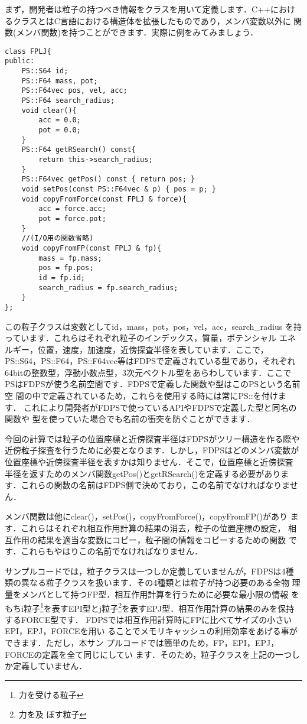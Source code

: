 \documentclass[twocolumn,10pt]{jarticle}
\begin{document}
まず，開発者は粒子の持つべき情報をクラスを用いて定義します．C++におけ
るクラスとはC言語における構造体を拡張したものであり，メンバ変数以外に
関数(メンバ関数)を持つことができます．実際に例をみてみましょう．

{\scriptsize
\begin{verbatim}
class FPLJ{
public:
    PS::S64 id;
    PS::F64 mass, pot;
    PS::F64vec pos, vel, acc;
    PS::F64 search_radius;
    void clear(){
        acc = 0.0;
        pot = 0.0;
    }
    PS::F64 getRSearch() const{
        return this->search_radius;
    }
    PS::F64vec getPos() const { return pos; }
    void setPos(const PS::F64vec & p) { pos = p; }
    void copyFromForce(const FPLJ & force){
        acc = force.acc;
        pot = force.pot;
    }
    //(I/O用の関数省略)
    void copyFromFP(const FPLJ & fp){ 
        mass = fp.mass;
        pos = fp.pos;
        id = fp.id;
        search_radius = fp.search_radius;
    }
};
\end{verbatim}
}

この粒子クラスは変数としてid，mass，pot，pos，vel，acc，search\_radius
を持っています．これらはそれぞれ粒子のインデックス，質量，ポテンシャル
エネルギー，位置，速度，加速度，近傍探査半径を表しています．ここで，
PS::S64，PS::F64，PS::F64vec等はFDPSで定義されている型であり，それぞれ
64bitの整数型，浮動小数点型，3次元ベクトル型をあらわしています．ここで
PSはFDPSが使う名前空間です．FDPSで定義した関数や型はこのPSという名前空
間の中で定義されているため，これらを使用する時には常にPS::を付けます．
これにより開発者がFDPSで使っているAPIやFDPSで定義した型と同名の関数や
型を使っていた場合でも名前の衝突を防ぐことができます．

今回の計算では粒子の位置座標と近傍探査半径はFDPSがツリー構造を作る際や
近傍粒子探査を行うために必要となります．しかし，FDPSはどのメンバ変数が
位置座標や近傍探査半径を表すかは知りません．そこで，位置座標と近傍探査
半径を返すためのメンバ関数getPos()とgetRSearch()を定義する必要がありま
す．これらの関数の名前はFDPS側で決めており，この名前でなければなりませ
ん．

メンバ関数は他にclear()，setPos()，copyFromForce()，copyFromFP()があり
ます．これらはそれぞれ相互作用計算の結果の消去，粒子の位置座標の設定，
相互作用の結果を適当な変数にコピー，粒子間の情報をコピーするための関数
です．これらもやはりこの名前でなければなりません．

サンプルコードでは，粒子クラスは一つしか定義していませんが，FDPSは4種
類の異なる粒子クラスを扱います．その4種類とは粒子が持つ必要のある全物
理量をメンバとして持つFP型．相互作用計算を行うために必要な最小限の情報
をもちi粒子\footnote{力を受ける粒子}を表すEPI型とj粒子\footnote{力を及
  ぼす粒子}を表すEPJ型．相互作用計算の結果のみを保持するFORCE型です．
FDPSでは相互作用計算時にFPに比べてサイズの小さいEPI，EPJ，FORCEを用い
ることでメモリキャッシュの利用効率をあげる事ができます．ただし，本サン
プルコードでは簡単のため，FP，EPI，EPJ，FORCEの定義を全て同じにしてい
ます．そのため，粒子クラスを上記の一つしか定義していません．
\end{document}
